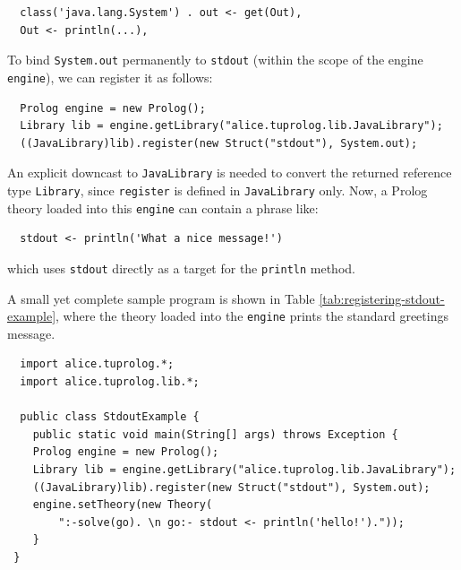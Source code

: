 \begin{verbatim}
  class('java.lang.System') . out <- get(Out),
  Out <- println(...),
\end{verbatim}

\noindent To bind \texttt{System.out} permanently to \texttt{stdout} (within the scope of the \tuprolog{} engine \texttt{engine}), we can register it as follows:

{\small
\begin{verbatim}
  Prolog engine = new Prolog();
  Library lib = engine.getLibrary("alice.tuprolog.lib.JavaLibrary");
  ((JavaLibrary)lib).register(new Struct("stdout"), System.out);
\end{verbatim}}

\noindent An explicit downcast to \texttt{JavaLibrary} is needed to convert the returned reference type \texttt{Library}, since \texttt{register} is defined in \texttt{JavaLibrary} only.
%
Now, a Prolog theory loaded into this \texttt{engine} can contain a phrase like:
%
\begin{verbatim}
  stdout <- println('What a nice message!')
\end{verbatim}
%
which uses \texttt{stdout} directly as a target for the \texttt{println} method.

A small yet complete sample program is shown in Table \ref{tab:registering-stdout-example}, where the theory loaded into the \texttt{engine} prints the standard greetings message.

\begin{table}[h]
{\small
\begin{verbatim}
  import alice.tuprolog.*;
  import alice.tuprolog.lib.*;

  public class StdoutExample {
    public static void main(String[] args) throws Exception {
    Prolog engine = new Prolog();
    Library lib = engine.getLibrary("alice.tuprolog.lib.JavaLibrary");
    ((JavaLibrary)lib).register(new Struct("stdout"), System.out);
    engine.setTheory(new Theory(
        ":-solve(go). \n go:- stdout <- println('hello!')."));
    }
 }
\end{verbatim}}
\caption{A program registering \texttt{stdout} for \texttt{System.out}. As an alternative to \texttt{getLibrary}, \texttt{loadLibrary} could have been used---if the library is already loaded, its behavior is identical to \texttt{getLibrary}'s.
%
Also, the fully qualified class name \texttt{"alice.tuprolog.lib.JavaLibrary"} is needed in \texttt{getLibrary} only because \texttt{JavaLibrary} does \textit{not} define a short library name (see Section \ref{ssec:library-name} for details): otherwise, the shorter name could have been used.}
\label{tab:registering-stdout-example}
\end{table}

